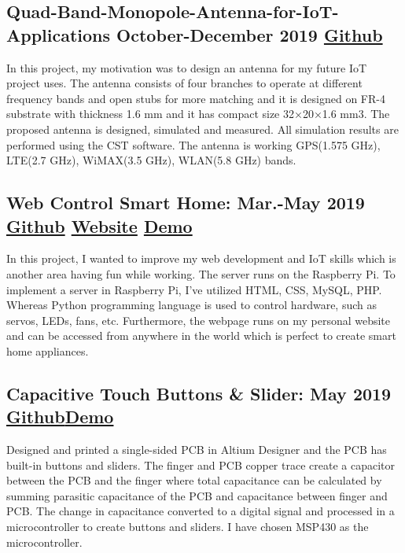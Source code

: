 \documentclass[10pt]{article}
\begin{document}
\subsection{Quad-Band-Monopole-Antenna-for-IoT-Applications October-December 2019 
\textcolor{Mycolor3}{\href{https://github.com/Zrrck/Quad-Band-Monopole-Antenna-for-IoT-Applications}{\small{Github}}}} 
In this project, my motivation was to design an antenna for my future IoT project uses. The antenna consists of four branches to operate at different frequency bands and open stubs for more matching and it is designed on FR-4 substrate with thickness 1.6 mm and it has compact size 32×20×1.6 mm3. The proposed antenna is designed, simulated and measured. All simulation results are performed using the CST software. The antenna is working GPS(1.575 GHz), LTE(2.7 GHz), WiMAX(3.5 GHz), WLAN(5.8 GHz) bands. 

\subsection{Web Control Smart Home: Mar.-May 2019 \textcolor{Mycolor3}{\href{https://github.com/Zrrck/Web-Control-Smart-Home}{\small{Github}}} \textcolor{Mycolor4}{\href{http://webtek.cetinkaya.co}{\small{Website}}}
\textcolor{Mycolor2}{\href{https://youtu.be/G7QD9RP_mmE}{\small{Demo}}}} 
In this project, I wanted to improve my web development and IoT skills which is another area having fun while working. The server runs on the Raspberry Pi. To implement a server in Raspberry Pi, I’ve utilized HTML, CSS, MySQL, PHP. Whereas Python programming language is used to control hardware, such as servos, LEDs, fans, etc. Furthermore, the webpage runs on my personal website and can be accessed from anywhere in the world which is perfect to create smart home appliances. 

\subsection{Capacitive Touch Buttons \& Slider: May 2019  
\textcolor{Mycolor3}{\href{https://github.com/Zrrck/Capacitive-Touch-Implementation-}{\small{Github}}}\textcolor{Mycolor2}{\href{https://youtu.be/4U37eLWOmPw} {\small{Demo}}}} 
Designed and printed a single-sided PCB in Altium Designer and the PCB has built-in buttons and sliders. The finger and PCB copper trace create a capacitor between the PCB and the finger where total capacitance can be calculated by summing parasitic capacitance of the PCB and capacitance between finger and PCB. The change in capacitance converted to a digital signal and processed in a microcontroller to create buttons and sliders. I have chosen MSP430 as the microcontroller.
\end{document}
